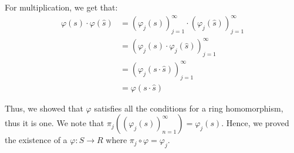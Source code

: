 \documentclass{article}
\begin{document}
\begin{enumerate}
\begin{enumerate}
        For multiplication, we get that: 
        \begin{align*}
            \varphi(s) \cdot \varphi(\hat{s}) &= (\varphi_j(s))^{\infty}_{j=1} \cdot (\varphi_j(\hat{s}))^{\infty}_{j=1}\\
            &= (\varphi_j(s) \cdot \varphi_j(\hat{s}))^{\infty}_{j=1} \\
            &= (\varphi_j(s \cdot \hat{s}))^{\infty}_{j=1}  \\
            &= \varphi(s \cdot\hat{s})
        \end{align*}

        Thus, we showed that $\varphi$ satisfies all the conditions for a ring homomorphism, thus it is one. We note that $\pi_j((\varphi_j(s))^{\infty}_{n=1}) = \varphi_j(s)$. Hence, we proved the existence of a $\varphi:S \rightarrow R$ where $\pi_j \circ \varphi = \varphi_j$. 
        
    \end{enumerate}

    
    
\end{enumerate}
\end{document}
